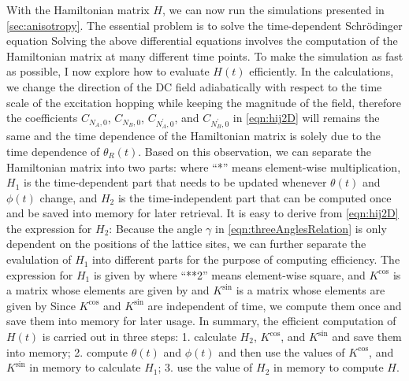 With the Hamiltonian matrix $H$, we can now run the simulations presented in \autoref{sec:anisotropy}. The 
essential problem is to solve the time-dependent Schr{\"o}dinger equation
Solving the above differential equations  involves the computation of the Hamiltonian matrix at many different 
time points. To make the simulation as fast as possible, I now explore how to evaluate $H(t)$ efficiently.
In the calculations, we change the direction of the DC field adiabatically with respect to the time scale of the excitation
 hopping while keeping the magnitude of the field, therefore the coefficients $C_{N_A, 0}$, $C_{N_B, 0}$, $C_{N_A^{'}, 0}$, and $C_{N_B^{'}, 0}$ in \autoref{eqn:hij2D} will remains the same and the time dependence of
the Hamiltonian matrix is solely due to the time dependence of $\theta_{R}(t)$. Based on this observation, we can
separate the Hamiltonian matrix into two parts: 
where  ``*'' means element-wise multiplication, $H_{1}$ is the time-dependent part that needs to be 
updated whenever $\theta(t)$ and $\phi(t)$ change, and $H_{2}$ is the time-independent part that can be 
computed once and be saved into memory for later retrieval. It is easy to derive from 
 \autoref{eqn:hij2D} the expression for $H_2$:
Because the angle $\gamma$ in \autoref{eqn:threeAnglesRelation} is only dependent on the positions of the lattice sites, we can further separate the evalulation of $H_1$ into different parts for the purpose of computing efficiency. The expression for $H_1$ is given by
where ``**2'' means element-wise square, and $K^{\cos}$ is a matrix whose elements are given by 
and $K^{\sin}$ is a matrix whose elements are given by 
Since $K^{\cos}$ and  $K^{\sin}$ are independent of time, we compute them once and save them into memory 
for later usage. In summary, the efficient computation of $H(t)$ is carried out in three steps: 1. calculate $H_2$, 
$K^{\cos}$, and $K^{\sin}$ and save them into memory; 2. compute $\theta(t)$ and $\phi(t)$ and then use
the values of $K^{\cos}$, and $K^{\sin}$ in memory to calculate $H_1$; 3. use the value of $H_2$ in memory to 
compute $H$.  

